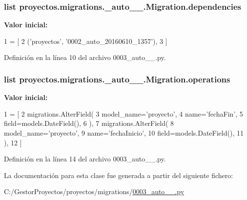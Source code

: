 \subsubsection[{\texorpdfstring{dependencies}{dependencies}}]{\setlength{\rightskip}{0pt plus 5cm}list proyectos.\+migrations.\+\_\+auto\+\_\+\_.\+Migration.\+dependencies\hspace{0.3cm}{\ttfamily [static]}}\hypertarget{classproyectos_1_1migrations_1_10003__auto__20160610__2156_1_1_migration_a54929c8ad0072412347e659d22d01064}{}\label{classproyectos_1_1migrations_1_10003__auto__20160610__2156_1_1_migration_a54929c8ad0072412347e659d22d01064}
{\bfseries Valor inicial\+:}
\begin{DoxyCode}
1 = [
2         (\textcolor{stringliteral}{'proyectos'}, \textcolor{stringliteral}{'0002\_auto\_20160610\_1357'}),
3     ]
\end{DoxyCode}


Definición en la línea 10 del archivo 0003\+\_\+auto\+\_\+\_.\+py.

\subsubsection[{\texorpdfstring{operations}{operations}}]{\setlength{\rightskip}{0pt plus 5cm}list proyectos.\+migrations.\+\_\+auto\+\_\+\_.\+Migration.\+operations\hspace{0.3cm}{\ttfamily [static]}}\hypertarget{classproyectos_1_1migrations_1_10003__auto__20160610__2156_1_1_migration_a0513659b472cdc7254fe2a7231c1afab}{}\label{classproyectos_1_1migrations_1_10003__auto__20160610__2156_1_1_migration_a0513659b472cdc7254fe2a7231c1afab}
{\bfseries Valor inicial\+:}
\begin{DoxyCode}
1 = [
2         migrations.AlterField(
3             model\_name=\textcolor{stringliteral}{'proyecto'},
4             name=\textcolor{stringliteral}{'fechaFin'},
5             field=models.DateField(),
6         ),
7         migrations.AlterField(
8             model\_name=\textcolor{stringliteral}{'proyecto'},
9             name=\textcolor{stringliteral}{'fechaInicio'},
10             field=models.DateField(),
11         ),
12     ]
\end{DoxyCode}


Definición en la línea 14 del archivo 0003\+\_\+auto\+\_\+\_.\+py.



La documentación para esta clase fue generada a partir del siguiente fichero\+:\begin{DoxyCompactItemize}
\item 
C\+:/\+Gestor\+Proyectos/proyectos/migrations/\hyperlink{0003__auto__20160610__2156_8py}{0003\+\_\+auto\+\_\+\_.\+py}\end{DoxyCompactItemize}
